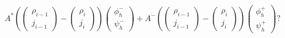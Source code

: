 \begin{equation*}
A^*\left(\begin{pmatrix} \rho_{i-1}\\j_{i-1} \end{pmatrix} - \begin{pmatrix} \rho_i\\ j_i\end{pmatrix} \right) \begin{pmatrix} \phi_h^-\\ \psi_h^-\end{pmatrix} 
+ A^- \left(\begin{pmatrix} \rho_{i-1}\\j_{i-1} \end{pmatrix} - \begin{pmatrix} \rho_i\\ j_i \end{pmatrix} \right) \begin{pmatrix} \phi_h^+\\ \psi_h^+\end{pmatrix} ?
\end{equation*}
